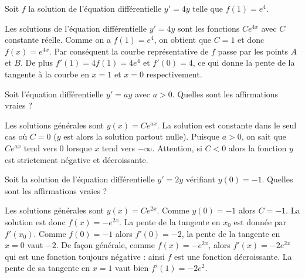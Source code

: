 \begin{question}
Soit $f$ la solution de l'équation différentielle $y'=4y$ telle que $f(1)= e^4$.
\begin{answers}
\end{answers}
\begin{explanations} Les solutions de l'équation différentielle $y'=4y$ sont les fonctions $C e^{4x}$ avec $C$ constante réelle. Comme on a $f(1)= e^4$, on obtient que $C=1$ et donc $f(x)= e^{4x}$. Par conséquent la courbe représentative de $f$ passe par les points $A$ et $B$. De plus $f'(1)=4f(1)=4 e^4$ et $f'(0)=4$, ce qui donne la pente de la tangente à la courbe en $x=1$ et $x=0$ respectivement.
\end{explanations}
\end{question}


\begin{question}
Soit l'équation différentielle $y' = ay$ avec $a>0$.
Quelles sont les affirmations vraies ?
\begin{answers}  
\end{answers}
\begin{explanations}
Les solutions générales sont $y(x) = Ce^{ax}$. La solution est constante dans le seul cas où $C=0$ ($y$ est alors la solution partout nulle). Puisque $a>0$, on sait que $Ce^{ax}$ tend vers $0$ lorsque $x$ tend vers $-\infty$. Attention, si $C<0$ alors la fonction $y$ est strictement négative et décroissante.
\end{explanations}
\end{question}


\begin{question}
Soit la solution de l'équation différentielle $y'= 2y$ vérifiant $y(0) = -1$.
Quelles sont les affirmations vraies ?
\begin{answers}  
\end{answers}
\begin{explanations}
Les solutions générales sont $y(x) = Ce^{2x}$. Comme $y(0)=-1$ alors $C = -1$.
La solution est donc  $f(x) = -e^{2x}$.
La pente de la tangente en $x_0$ est donnée par $f'(x_0)$.
Comme $f(0)=-1$ alors $f'(0) = -2$, la pente de la tangente en $x=0$ vaut $-2$.
De façon générale, comme $f(x) = -e^{2x}$, alors $f'(x) = -2e^{2x}$ qui est une fonction toujours négative : ainsi $f$ est une fonction décroissante. La pente de sa tangente en $x=1$ vaut bien $f'(1) = -2e^2$.
\end{explanations}
\end{question}


